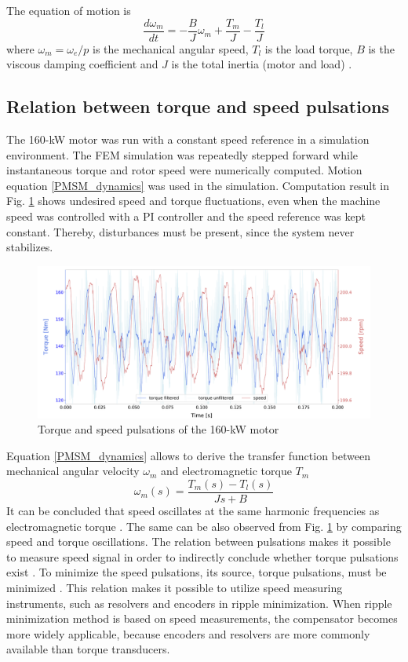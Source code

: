 The equation of motion is
\begin{equation}
    \frac{d \omega_m}{dt} = -\frac{B}{J}\omega_m + \frac{T_m}{J} - \frac{T_l}{J}
    \label{PMSM_dynamics}
\end{equation}
where $\omega_m = \omega_e / p$ is the mechanical angular speed, $T_l$ is the load torque, $B$ is the viscous damping coefficient and $J$ is the total inertia (motor and load) \cite{ILC:2005}. 


\subsection{Relation between torque and speed pulsations}
The 160-kW motor was run with a constant speed reference in a simulation environment. The FEM simulation was repeatedly stepped forward while instantaneous torque and rotor speed were numerically computed. Motion equation \eqref{PMSM_dynamics} was used in the simulation. Computation result in Fig. \ref{SDM_speed_torque} shows undesired speed and torque fluctuations, even when the machine speed was controlled with a PI controller and the speed reference was kept constant. Thereby, disturbances must be present, since the system never stabilizes.
\begin{figure}[htb]
    \centering
    \includegraphics[width=1\linewidth]{images/torque-speed-pulsations.pdf}
    \caption{Torque and speed pulsations of the 160-kW motor}
    \label{SDM_speed_torque} 
\end{figure}

Equation \eqref{PMSM_dynamics} allows to derive the transfer function between mechanical angular velocity $\omega_m$ and electromagnetic torque $T_m$
\begin{equation}
    \omega_m(s) = \frac{T_m(s) - T_l(s)}{Js + B}
    \label{Eq:transfer_function}
\end{equation}
It can be concluded that speed oscillates at the same harmonic frequencies as electromagnetic torque \cite{ILC:2005, ILC:2018}. The same can be also observed from Fig. \ref{SDM_speed_torque} by comparing speed and torque oscillations. The relation between pulsations makes it possible to measure speed signal in order to indirectly conclude whether torque pulsations exist \cite{ILC:2005}. To minimize the speed pulsations, its source, torque pulsations, must be minimized \cite{ILC:2004, ILC:2018}. This relation makes it possible to utilize speed measuring instruments, such as resolvers and encoders in ripple minimization. When ripple minimization method is based on speed measurements, the compensator becomes more widely applicable, because encoders and resolvers are more commonly available than torque transducers.

